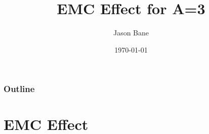 \documentclass{beamer}
\title[EMC A=3]{EMC Effect for A=3 } %
\author{Jason Bane} %
\institute[UTK] %
{
University of Tennessee \\ %
\medskip
\textit{jbane1@vols.utk.edu} %
}
\date{\today} %
\begin{document}
\begin{frame}
	\titlepage %
\end{frame}

\begin{frame}
\frametitle{Outline}
	\tableofcontents %
\end{frame}


\section{EMC Effect} %

\end{document}
